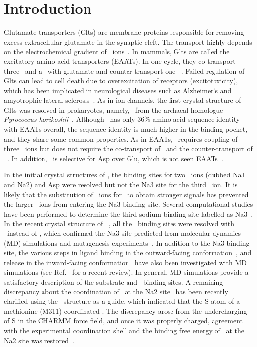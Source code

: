 \section{Introduction}
\label{bind:intro}
Glutamate transporters (Glts) are membrane proteins responsible for removing excess extracellular 
glutamate in the synaptic cleft. The transport highly depends on the electrochemical gradient of 
\Na\ ions~\cite{Danbolt2001}. In mammals, Glts are called the excitatory amino-acid transporters 
(EAATs). In one cycle, they co-transport three \Na\ and a \Hi\ with glutamate and counter-transport 
one \K~\cite{Vandenberg2013}. Failed regulation of Glts can lead to cell death due to overexcitation 
of receptors (excitotoxicity), which has been implicated in neurological diseases such as Alzheimer’s 
and amyotrophic lateral sclerosis~\cite{Danbolt2001}. As in ion channels, the first crystal structure 
of Glts was resolved in prokaryotes, namely, \GltPh\ from the archaeal homologue \textit{Pyrococcus 
horikoshii}~\cite{Yernool2004,Boudker2007}. Although \GltPh\ has only 36\% amino-acid sequence identity 
with EAATs overall, the sequence identity is much higher in the binding pocket, and they share some 
common properties. As in EAATs, \GltPh\ requires coupling of three \Na\ ions but does not require the 
co-transport of \Hi\ and the counter-transport of \K~\cite{Groeneveld2010}. In addition, \GltPh\ is 
selective for Asp over Glu, which is not seen EAATs~\cite{Vandenberg2013}. 

In the initial crystal structures of \GltPh, the binding sites for two \Na\ ions (dubbed Na1 and 
Na2) and Asp were resolved but not the Na3 site for the third \Na\ ion. It is likely that the 
substitution of \Tl\ ions for \Na\ to obtain stronger signals has prevented the larger \Tl\ ions 
from entering the Na3 binding site. Several computational studies have been performed to determine 
the third sodium binding site labelled as Na3~\cite{Holley2009,Larsson2010,Tao2010,Huang2010,Bastug2012}. 
In the recent crystal structure of \GltTk~\cite{Guskov2016}, all the \Na\ binding sites were resolved 
with \Na\ instead of \Tl, which confirmed the Na3 site predicted from molecular dynamics (MD) simulations 
and mutagenesis experiments~\cite{Bastug2012}. In addition to the Na3 binding site, the various steps 
in ligand binding in the outward-facing conformation~\cite{Shrivastava2008,Huang2008,Heinzelmann2011,Grazioso2012}, 
and release in the inward-facing conformation~\cite{DeChancie2011a,Zomot2013,Heinzelmann2013,Heinzelmann2014a} 
have also been investigated with MD simulations (see Ref.~\cite{Setiadi2015} for a recent review). In 
general, MD simulations provide a satisfactory description of the substrate and \Na\ binding sites. A 
remaining discrepancy about the coordination of \Na\ at the Na2 site~\cite{Venkatesan2015,Heinzelmann2011} 
has been recently clarified using the \GltTk\ structure \cite{Guskov2016} as a guide, which indicated that 
the S atom of a methionine (M311) coordinated \Na. The discrepancy arose from the undercharging of S in the 
CHARMM force field, and once it was properly charged, agreement with the experimental coordination shell 
and the binding free energy of \Na\ at the Na2 site was restored~\cite{Setiadi2017}. 

